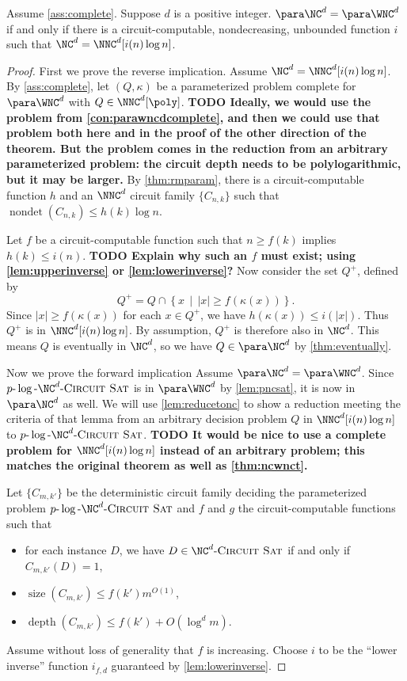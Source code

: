 \documentclass{article}
\newcommand{\todo}[1]{\textbf{TODO #1}}
\newcommand{\dash}{\textnormal{-}}
\newcommand{\pncsat}{p\dash\log\dash\NC^d\dash\textsc{Circuit Sat}}
\DeclareMathOperator{\depth}{depth}
\DeclareMathOperator{\nondet}{nondet}
\DeclareMathOperator{\size}{size}
\begin{document}
\begin{theorem}\label{thm:ncwnc}
  Assume \autoref{ass:complete}.
  Suppose $d$ is a positive integer.
  $\para \NC^d = \para \WNC^d$ if and only if there is a circuit-computable, nondecreasing, unbounded function $i$ such that $\NC^d = \NNC^d[i(n) \log n]$.
\end{theorem}
\begin{proof}
  First we prove the reverse implication.
  Assume $\NC^d = \NNC^d[i(n) \log n]$.
  By \autoref{ass:complete}, let $(Q, \kappa)$ be a parameterized problem complete for $\para \WNC^d$ with $Q \in \NNC^d[\poly]$.
  \todo{
    Ideally, we would use the problem from \autoref{con:parawncdcomplete}, and then we could use that problem both here and in the proof of the other direction of the theorem.
    But the problem comes in the reduction from an arbitrary parameterized problem: the circuit depth needs to be polylogarithmic, but it may be larger.
  }
  By \autoref{thm:rmparam}, there is a circuit-computable function $h$ and an $\NNC^d$ circuit family $\{C_{n, k}\}$ such that $\nondet(C_{n, k}) \leq h(k) \log n$.

  Let $f$ be a circuit-computable function such that $n \geq f(k)$ implies $h(k) \leq i(n)$.
  \todo{Explain why such an $f$ must exist; using \autoref{lem:upperinverse} or \autoref{lem:lowerinverse}?}
  Now consider the set $Q^+$, defined by
  \[
  Q^+ = Q \cap \left\{ x \, \middle| \, |x| \geq f(\kappa(x)) \right\}.
  \]
  Since $|x| \geq f(\kappa(x))$ for each $x \in Q^+$, we have $h(\kappa(x)) \leq i(|x|)$.
  Thus $Q^+$ is in $\NNC^d[i(n) \log n]$.
  By assumption, $Q^+$ is therefore also in $\NC^d$.
  This means $Q$ is eventually in $\NC^d$, so we have $Q \in \para \NC^d$ by \autoref{thm:eventually}.

  Now we prove the forward implication
  Assume $\para \NC^d = \para \WNC^d$.
  Since $\pncsat$ is in $\para \WNC^d$ by \autoref{lem:pncsat}, it is now in $\para \NC^d$ as well.
  We will use \autoref{lem:reducetonc} to show a reduction meeting the criteria of that lemma from an arbitrary decision problem $Q$ in $\NNC^d[i(n) \log n]$ to $\pncsat$.
  \todo{It would be nice to use a complete problem for $\NNC^d[i(n) \log n]$ instead of an arbitrary problem; this matches the original theorem as well as \autoref{thm:ncwnct}.}

  Let $\{C_{m, k'}\}$ be the deterministic circuit family deciding the parameterized problem $\pncsat$ and $f$ and $g$ the circuit-computable functions such that
  \begin{itemize}
  \item for each instance $D$, we have $D \in \NC^d\textnormal{-}\textsc{Circuit Sat}$ if and only if $C_{m, k'}(D) = 1$,
  \item $\size(C_{m, k'}) \leq f(k') m^{O(1)}$,
  \item $\depth(C_{m, k'}) \leq f(k') + O(\log^d m)$.
  \end{itemize}
  Assume without loss of generality that $f$ is increasing.
  Choose $i$ to be the ``lower inverse'' function $i_{f, d}$ guaranteed by \autoref{lem:lowerinverse}.


\end{proof}
\end{document}
